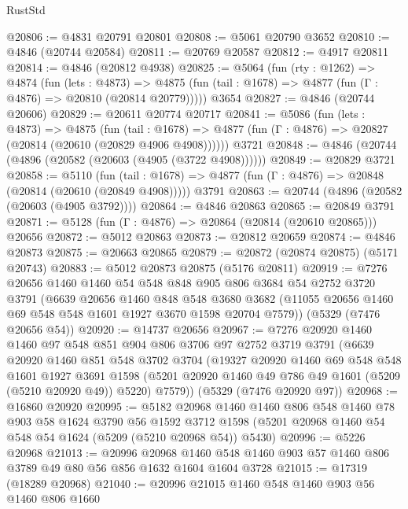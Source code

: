 \begin{lexlean}{RustStd}
\begin{coremodule}
@20806 := @4831 @20791 @20801
@20808 := @5061 @20790 @3652
@20810 := @4846 (@20744 @20584)
@20811 := @20769 @20587
@20812 := @4917 @20811
@20814 := @4846 (@20812 @4938)
@20825 := @5064
    (fun (rty : @1262) =>
    @4874
      (fun (lets : @4873) =>
      @4875 (fun (tail : @1678) => @4877 (fun (Γ : @4876) => @20810 (@20814 @20779)))))
    @3654
@20827 := @4846 (@20744 @20606)
@20829 := @20611 @20774 @20717
@20841 := @5086
    (fun (lets : @4873) =>
    @4875
      (fun (tail : @1678) =>
      @4877 (fun (Γ : @4876) => @20827 (@20814 (@20610 (@20829 @4906 @4908))))))
    @3721
@20848 := @4846 (@20744 (@4896 (@20582 (@20603 (@4905 (@3722 @4908))))))
@20849 := @20829 @3721
@20858 := @5110
    (fun (tail : @1678) => @4877 (fun (Γ : @4876) => @20848 (@20814 (@20610 (@20849 @4908)))))
    @3791
@20863 := @20744 (@4896 (@20582 (@20603 (@4905 @3792))))
@20864 := @4846 @20863
@20865 := @20849 @3791
@20871 := @5128 (fun (Γ : @4876) => @20864 (@20814 (@20610 @20865))) @20656
@20872 := @5012 @20863
@20873 := @20812 @20659
@20874 := @4846 @20873
@20875 := @20663 @20865
@20879 := @20872 (@20874 @20875) (@5171 @20743)
@20883 := @5012 @20873 @20875 (@5176 @20811)
@20919 := @7276
    @20656
    @1460
    @1460
    @54
    @548
    @848
    @905
    @806
    @3684
    @54
    @2752
    @3720
    @3791
    (@6639
      @20656
      @1460
      @848
      @548
      @3680
      @3682
      (@11055 @20656 @1460 @69 @548 @548 @1601 @1927 @3670 @1598 @20704 @7579))
    (@5329 (@7476 @20656 @54))
@20920 := @14737 @20656
@20967 := @7276
    @20920
    @1460
    @1460
    @97
    @548
    @851
    @904
    @806
    @3706
    @97
    @2752
    @3719
    @3791
    (@6639
      @20920
      @1460
      @851
      @548
      @3702
      @3704
      (@19327
        @20920
        @1460
        @69
        @548
        @548
        @1601
        @1927
        @3691
        @1598
        (@5201 @20920 @1460 @49 @786 @49 @1601 (@5209 (@5210 @20920 @49)) @5220)
        @7579))
    (@5329 (@7476 @20920 @97))
@20968 := @16860 @20920
@20995 := @5182
    @20968
    @1460
    @1460
    @806
    @548
    @1460
    @78
    @903
    @58
    @1624
    @3790
    @56
    @1592
    @3712
    @1598
    (@5201 @20968 @1460 @54 @548 @54 @1624 (@5209 (@5210 @20968 @54)) @5430)
@20996 := @5226 @20968
@21013 := @20996
    @20968
    @1460
    @548
    @1460
    @903
    @57
    @1460
    @806
    @3789
    @49
    @80
    @56
    @856
    @1632
    @1604
    @1604
    @3728
@21015 := @17319 (@18289 @20968)
@21040 := @20996
    @21015
    @1460
    @548
    @1460
    @903
    @56
    @1460
    @806
    @1660

\end{coremodule}
\end{lexlean}

